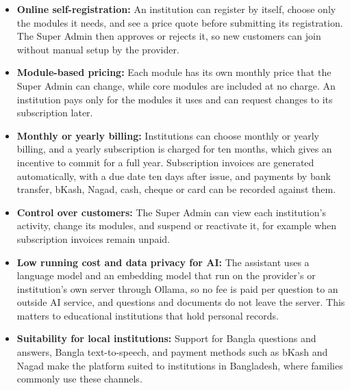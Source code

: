 \begin{itemize}
    \item \textbf{Online self-registration:} An institution can register by itself, choose only the modules it needs, and see a price quote before submitting its registration. The Super Admin then approves or rejects it, so new customers can join without manual setup by the provider.

    \item \textbf{Module-based pricing:} Each module has its own monthly price that the Super Admin can change, while core modules are included at no charge. An institution pays only for the modules it uses and can request changes to its subscription later.

    \item \textbf{Monthly or yearly billing:} Institutions can choose monthly or yearly billing, and a yearly subscription is charged for ten months, which gives an incentive to commit for a full year. Subscription invoices are generated automatically, with a due date ten days after issue, and payments by bank transfer, bKash, Nagad, cash, cheque or card can be recorded against them.

    \item \textbf{Control over customers:} The Super Admin can view each institution's activity, change its modules, and suspend or reactivate it, for example when subscription invoices remain unpaid.

    \item \textbf{Low running cost and data privacy for AI:} The assistant uses a language model and an embedding model that run on the provider's or institution's own server through Ollama, so no fee is paid per question to an outside AI service, and questions and documents do not leave the server. This matters to educational institutions that hold personal records.

    \item \textbf{Suitability for local institutions:} Support for Bangla questions and answers, Bangla text-to-speech, and payment methods such as bKash and Nagad make the platform suited to institutions in Bangladesh, where families commonly use these channels.
\end{itemize}

